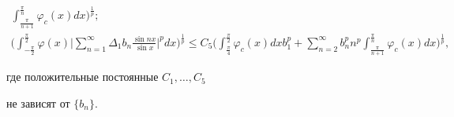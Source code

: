 \begin{lem}
\begin{gather}
\int_{\frac{\pi}{n+1}}^{\frac{\pi}{n}}


\varphi_c(x) dx \bigg)^{\frac{1}{p}}; \\


%


\bigg( \int_{- \frac{\pi}{2}}^{\frac{\pi}{2}} 


\varphi(x)\bigg|\sum\limits_{n=1}^{\infty}


\Delta _1b_n \frac{\sin nx}{\sin x}


\bigg|^p dx \bigg)^{\frac{1}{p}} \leq


C_5\bigg( \int_{\frac{\pi}{4}}^{\frac{\pi}{2}}


\varphi_c(x) dx b_1^p + \sum\limits_{n=2}^{\infty} b_n^p n^p


\int_{\frac{\pi}{n+1}}^{\frac{\pi}{n}}


\varphi_c(x) dx \bigg)^{\frac{1}{p}},


\end{gather}


где положительные постоянные $C_1,\dotsc,C_5$


не зависят от $\{b_n\}$.


\end{lem}





